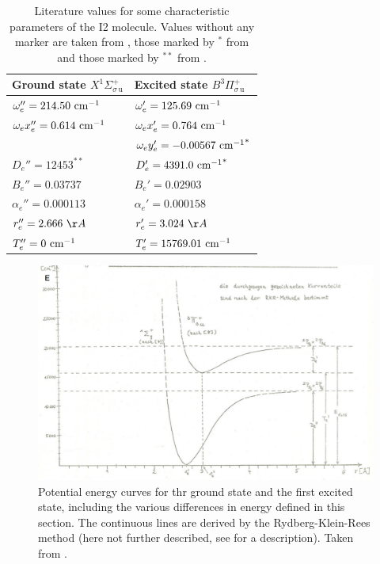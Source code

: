 \begin{table}[h]
    \centering
    \begin{tabular}{|l |l |}
        \hline
        Ground state $X ^1\Sigma_{\sigma \, \mathrm{u}}^{+}$ & 
        Excited state $B ^3\Pi_{\sigma \, \mathrm{u}}^{+}$ \\ \hline
        $\omega_e'' = 214.50 \ \mathrm{cm^{-1}}    $ & $\omega_e' = 125.69 \ \mathrm{cm^{-1}}             $  \\ \hline
        $\omega_e x_e'' = 0.614 \ \mathrm{cm^{-1}} $ & $\omega_e x_e' = 0.764 \ \mathrm{cm^{-1}}          $  \\ \hline
        $                           $ & $\omega_e y_e' = -0.00567 \ \mathrm{cm^{-1}} ^*    $  \\ \hline
        $ D_e'' = 12453 ^{**}$      & $ D_e' = 4391.0 \ \mathrm{cm^{-1}} ^*                $  \\ \hline
        $ B_e'' = 0.03737           $ & $ B_e' = 0.02903                    $  \\ \hline
        $ \alpha_e'' = 0.000113     $ & $ \alpha_e' = 0.000158              $  \\ \hline
        $ r_e'' = 2.666 \ \AA       $ & $ r_e' = 3.024 \ \AA                $  \\ \hline
        $ T_e'' = 0 \ \mathrm{cm^{-1}}             $ & $T_e' = 15769.01 \ \mathrm{cm^{-1}}                $ \\ \hline
    \end{tabular}
    \caption{Literature values for some characteristic parameters of the I2 molecule.
    Values without any marker are taken from \cite{nist}, 
    those marked by $^*$ from \cite{steinfeld1965spectroscopic} and 
    those marked by $^{**}$ from \cite{leroy1970spectroscopic}.}
    \label{tab:lit_val}
\end{table}

\begin{figure}
    \centering
    \includegraphics[width=1.0\textwidth]{pics/i2_pot2.pdf}
    \caption{Potential energy curves for thr ground state and the first excited 
    state, including the various differences in energy defined in this section. 
    The continuous lines are derived by the Rydberg-Klein-Rees method (here not 
    further described, see \cite{zare1964calculation} for a description). 
    Taken from \cite{staatsexamen}.}
    \label{fig:i2_pot2}
\end{figure}

\FloatBarrier
